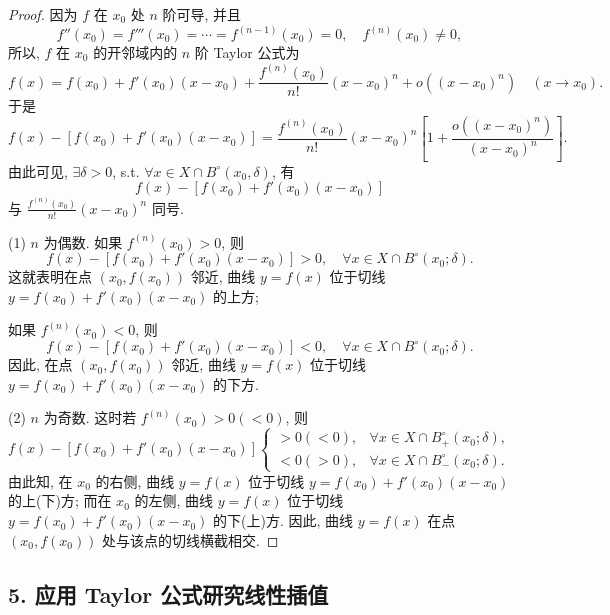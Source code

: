 \begin{proof}
因为 $f$ 在 $x_{0}$ 处 $n$ 阶可导, 并且
\[
f''(x_{0})=f'''(x_{0})=\cdots=f^{(n-1)}(x_{0})=0,\quad f^{(n)}(x_{0})\neq 0,
\]
所以, $f$ 在 $x_{0}$ 的开邻域内的 $n$ 阶 Taylor 公式为
\[
f(x)=f(x_{0})+f'(x_{0})(x-x_{0})+\frac{f^{(n)}(x_{0})}{n!}(x-x_{0})^{n}+o((x-x_{0})^{n})\quad (x\to x_{0}).
\]
于是
\[
f(x)-\left[f(x_{0})+f'(x_{0})(x-x_{0})\right]
=\frac{f^{(n)}(x_{0})}{n!}(x-x_{0})^{n}\left[1+\frac{o((x-x_{0})^{n})}{(x-x_{0})^{n}}\right].
\]
由此可见, $\exists\delta>0$, s.t. $\forall x\in X\cap B^\circ(x_{0},\delta)$, 有
\[
f(x)-\left[f(x_{0})+f'(x_{0})(x-x_{0})\right]
\]
与 $\frac{f^{(n)}(x_{0})}{n!}(x-x_{0})^{n}$ 同号.

(1) $n$ 为偶数. 如果 $f^{(n)}(x_{0})>0$, 则
\[
f(x)-\left[f(x_{0})+f'(x_{0})(x-x_{0})\right]>0,\quad\forall x\in X\cap B^\circ(x_{0};\delta).
\]
这就表明在点 $(x_{0}, f(x_{0}))$ 邻近, 曲线 $y = f(x)$ 位于切线 $y = f(x_{0}) + f'(x_{0})(x - x_{0})$ 的上方;

如果 $f^{(n)}(x_{0})<0$, 则
\[
f(x)-\left[f(x_{0})+f'(x_{0})(x-x_{0})\right]<0,\quad\forall x\in X\cap B^\circ(x_{0};\delta).
\]
因此, 在点 $(x_{0}, f(x_{0}))$ 邻近, 曲线 $y=f(x)$ 位于切线 $y=f(x_{0})+f'(x_{0})(x-x_{0})$ 的下方.

(2) $n$ 为奇数. 这时若 $f^{(n)}(x_{0})>0(<0)$, 则
\[
f(x)-\left[f(x_{0})+f'(x_{0})(x-x_{0})\right]
\begin{cases}
>0(<0), & \forall x\in X\cap B_+^\circ(x_{0};\delta), \\
<0(>0), & \forall x\in X\cap B_-^\circ(x_{0};\delta).
\end{cases}
\]
由此知, 在 $x_{0}$ 的右侧, 曲线 $y = f(x)$ 位于切线 $y = f(x_{0}) + f'(x_{0})(x - x_{0})$ 的上(下)方; 而在 $x_{0}$ 的左侧, 曲线 $y = f(x)$ 位于切线 $y = f(x_{0}) + f'(x_{0})(x - x_{0})$ 的下(上)方. 因此, 曲线 $y = f(x)$ 在点 $(x_{0}, f(x_{0}))$ 处与该点的切线横截相交.
\end{proof}

\subsection*{5. 应用 Taylor 公式研究线性插值}

